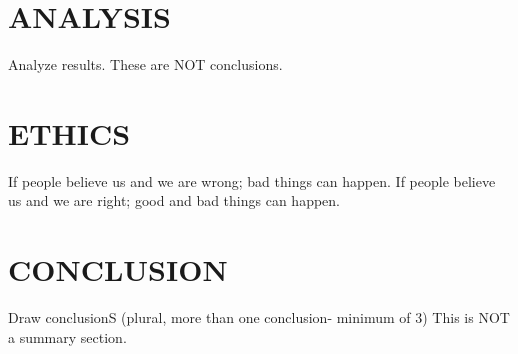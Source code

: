 \documentclass[]{llncs}
\begin{document}
\section{ANALYSIS}
Analyze results.
These are NOT conclusions.
\section{ETHICS}
If people believe us and we are wrong; bad things can happen. If people believe us and we are right; good and bad things can happen.
\section{CONCLUSION}
Draw conclusionS (plural, more than one conclusion- minimum of 3)
This is NOT a summary section.


\end{document}

